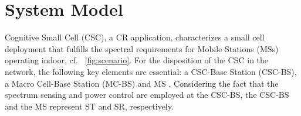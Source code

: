 \section{System Model} \label{sec:sys_mod}
Cognitive Small Cell (CSC), a CR application, characterizes a small cell deployment that fulfills the spectral requirements for Mobile Stations (MSs) operating indoor, cf. \figurename~\ref{fig:scenario}.
For the disposition of the CSC in the network, the following key elements are essential: a CSC-Base Station (CSC-BS), a Macro Cell-Base Station (MC-BS) and MS \cite{Kaushik16}.
Considering the fact that the spectrum sensing and power control are employed at the CSC-BS, the CSC-BS and the MS represent ST and SR, respectively.

